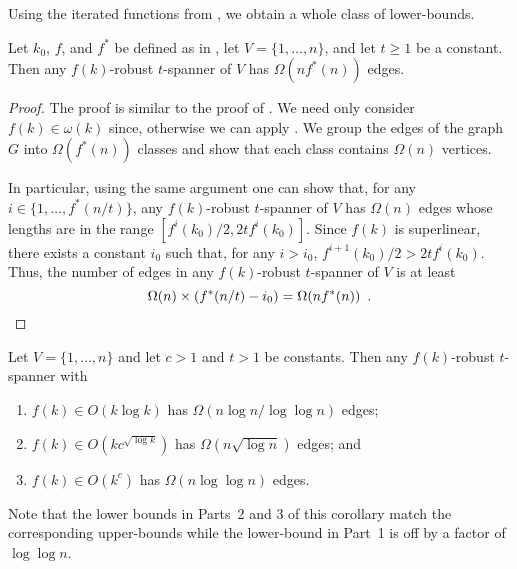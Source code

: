 \documentclass[final]{siamltex}
\begin{document}
Using the iterated functions from , we obtain a whole
class of lower-bounds.

\begin{thm}
  Let $k_0$, $f$, and $f^*$ be defined as in ,
  let $V=\{1,\ldots,n\}$, and let $t\ge 1$ be a constant.  Then any
  $f(k)$-robust $t$-spanner of $V$ has $\Omega(nf^*(n))$ edges.
\end{thm}

\begin{proof}
  The proof is similar to the proof of .
  We need only consider $f(k)\in\omega(k)$ since, otherwise we can apply
  .  We group the edges of the graph
  $G$ into $\Omega(f^*(n))$ classes and show that each class contains
  $\Omega(n)$ vertices.  

  In particular, using the same argument one can show that, for
  any $i\in\{1,\ldots,f^*(n/t)\}$, any $f(k)$-robust $t$-spanner
  of $V$ has $\Omega(n)$ edges whose lengths are in the range
  $[f^i(k_0)/2,2tf^i(k_0)]$.  Since $f(k)$ is superlinear, there exists
  a constant $i_0$ such that, for any $i>i_0$, $f^{i+1}(k_0)/2 > 2tf^i(k_0)$.
  Thus, the number of edges in any $f(k)$-robust $t$-spanner of $V$ is at least
  \[  \Omega(n) \times (f^*(n/t)-i_0) = \Omega(n f^*(n)) \enspace . \qedhere \]
\end{proof}

\begin{cor}
  Let $V=\{1,\ldots,n\}$ and let $c>1$ and $t>1$ be constants.  Then any
  $f(k)$-robust $t$-spanner with
  \begin{enumerate}
    \item $f(k)\in O(k\log k)$ has $\Omega(n\log n/\log\log n)$ edges;
    \item $f(k)\in O(kc^{\sqrt{\log k}})$ has $\Omega(n\sqrt{\log n})$
      edges; and
    \item $f(k)\in O(k^{c})$ has $\Omega(n\log\log n)$ edges.
  \end{enumerate}
\end{cor}

Note that the lower bounds in Parts~2 and 3 of this corollary match the
corresponding upper-bounds while the lower-bound in Part~1 is off by a
factor of $\log\log n$.
\end{document}
